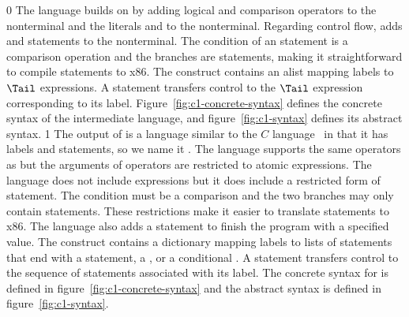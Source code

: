 \documentclass[7x10]{TimesAPriori_MIT}%
\def\racketEd{0}
\def\pythonEd{1}
\def\edition{1}
\newcommand{\pythonColor}[0]{}
\numberwithin{theorem}{chapter}
\numberwithin{definition}{chapter}
\numberwithin{equation}{chapter}
\begin{document}
{\if\edition\racketEd
%
The \LangCIf{} language builds on \LangCVar{} by adding logical and
comparison operators to the \Exp{} nonterminal and the literals
\TRUE{} and \FALSE{} to the \Arg{} nonterminal.  Regarding control
flow, \LangCIf{} adds  and  statements to the
\Tail{} nonterminal. The condition of an  statement is a
comparison operation and the branches are  statements,
making it straightforward to compile  statements to x86.  The
 construct contains an alist mapping labels to $\Tail$
expressions. A  statement transfers control to the $\Tail$
expression corresponding to its label.
%
Figure~\ref{fig:c1-concrete-syntax} defines the concrete syntax of the
\LangCIf{} intermediate language, and figure~\ref{fig:c1-syntax}
defines its abstract syntax.
%
\fi}
%
{\if\edition\pythonEd\pythonColor
%
The output of  is a language similar to the
$C$ language~\citep{Kernighan:1988nx} in that it has labels and
 statements, so we name it \LangCIf{}.  
%
The \LangCIf{} language supports the same operators as \LangIf{} but
the arguments of operators are restricted to atomic expressions. The
\LangCIf{} language does not include  expressions but it does
include a restricted form of  statement. The condition must be
a comparison and the two branches may only contain 
statements. These restrictions make it easier to translate 
statements to x86.  The \LangCIf{} language also adds a 
statement to finish the program with a specified value.
%
The  construct contains a dictionary mapping labels to
lists of statements that end with a  statement, a
, or a conditional .
%
A  statement transfers control to the sequence of statements
associated with its label.
%
The concrete syntax for \LangCIf{} is defined in
figure~\ref{fig:c1-concrete-syntax} and the abstract syntax is defined
in figure~\ref{fig:c1-syntax}.
%
\fi}
%

\newcommand{\CifGrammarRacket}{
\begin{array}{lcl}
\Atm &::=& \itm{bool} \\
\itm{cmp} &::= & \code{eq?} \MID \code{<} \MID \code{<=} \MID \code{>} \MID \code{>=} \\
\Exp &::=& \CNOT{\Atm} \MID \LP \itm{cmp}~\Atm~\Atm\RP \\
\Tail &::= & \key{goto}~\itm{label}\key{;}\\
   &\MID& \key{if}~\LP \itm{cmp}~\Atm~\Atm \RP~ \key{goto}~\itm{label}\key{;} ~\key{else}~\key{goto}~\itm{label}\key{;} 
\end{array}
}
\end{document}
